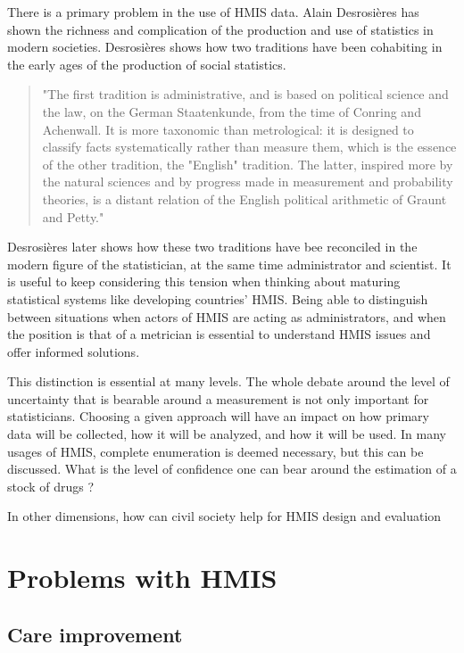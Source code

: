 \documentclass[a4paper,11pt,final,twoside]{article}
\begin{document}
There is a primary problem in the use of HMIS data. Alain Desrosières has shown the richness and complication of the production and use of statistics in modern societies. Desrosières shows how two traditions have been cohabiting in the early ages of the production of social statistics\cite{admin_savant}. 

\begin{quote}
"The first tradition is administrative, and is based on political science and the law, on the German Staatenkunde, from the time of Conring and Achenwall. It is more taxonomic than metrological: it is designed to classify facts systematically rather than measure them, which is the essence of the other tradition, the "English" tradition. The latter, inspired more by the natural sciences and by progress made in measurement and probability theories, is a distant relation of the English political arithmetic of Graunt and Petty."
\end{quote}

Desrosières later shows how these two traditions have bee reconciled in the modern figure of the statistician, at the same time administrator and scientist. It is useful to keep considering this tension when thinking about maturing statistical systems like developing countries' HMIS. Being able to distinguish between situations when actors of HMIS are acting as administrators, and when the position is that of a metrician is essential to understand HMIS issues and offer informed solutions. 

This distinction is essential at many levels. The whole debate around the level of uncertainty that is bearable around a measurement is not only important for statisticians. Choosing a given approach will have an impact on how primary data will be collected, how it will be analyzed, and how it will be used. In many usages of HMIS, complete enumeration is deemed necessary, but this can be discussed. What is the level of confidence one can bear around the estimation of a stock of drugs ?

In other dimensions, how can civil society help for HMIS design and evaluation


\section{Problems with HMIS}

	\subsection{Care improvement}
	
\end{document}
